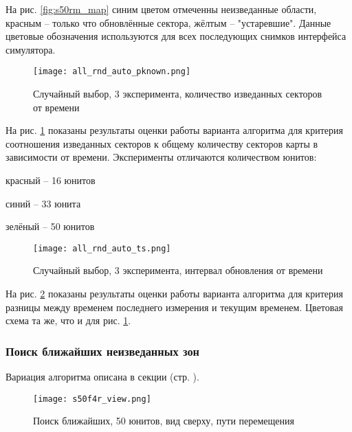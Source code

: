 На рис. \ref{fig:s50rm_map} синим цветом отмеченны неизведанные области, красным --
только что обновлённые сектора, жёлтым -- "устаревшие". Данные цветовые обозначения
используются для всех последующих снимков интерфейса симулятора.

\begin{figure}[h!]
    \centering
    \texttt{[image: all\_rnd\_auto\_pknown.png]}
    \caption{Случайный выбор, 3 эксперимента, количество изведанных секторов от времени}
    \label{fig:all_rnd_auto_pk}
\end{figure}

На рис. \ref{fig:all_rnd_auto_pk} показаны результаты оценки работы варианта алгоритма для
критерия соотношения изведанных секторов к общему количеству секторов карты в зависимости
от времени. Эксперименты отличаются количеством юнитов:
\begin{mintemize}
\item красный -- 16 юнитов
\item синий -- 33 юнита
\item зелёный -- 50 юнитов
\end{mintemize}

\begin{figure}[h!]
    \centering
    \texttt{[image: all\_rnd\_auto\_ts.png]}
    \caption{Случайный выбор, 3 эксперимента, интервал обновления от времени}
    \label{fig:all_rnd_auto_ts}
\end{figure}

\newpage

На рис. \ref{fig:all_rnd_auto_ts} показаны результаты оценки работы варианта алгоритма для
критерия разницы между временем последнего измерения и текущим временем.
Цветовая схема та же, что и для рис. \ref{fig:all_rnd_auto_pk}.

\clearpage
\newpage

\subsubsection{Поиск ближайших неизведанных зон}

Вариация алгоритма описана в секции  (стр. \pageref{ref:algo:choise:find}).

\begin{figure}[h!]
    \centering
    \texttt{[image: s50f4r\_view.png]}
    \caption{Поиск ближайших, 50 юнитов, вид сверху, пути перемещения}
    \label{fig:s50f4r_view}
\end{figure}

